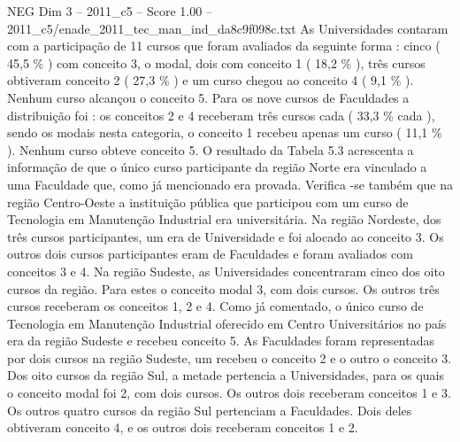 \begin{textsample}{NEG Dim 3 – 2011\_c5 – Score 1.00 – 2011\_c5/enade\_2011\_tec\_man\_ind\_da8c9f098c.txt}
As Universidades contaram com a participação de 11 cursos que foram avaliados da seguinte forma : cinco ( 45,5 \% ) com conceito 3, o modal, dois com conceito 1 ( 18,2 \% ), três cursos obtiveram conceito 2 ( 27,3 \% ) e um curso chegou ao conceito 4 ( 9,1 \% ).
Nenhum curso alcançou o conceito 5.
Para os nove cursos de Faculdades a distribuição foi : os conceitos 2 e 4 receberam três cursos cada ( 33,3 \% cada ), sendo os modais nesta categoria, o conceito 1 recebeu apenas um curso ( 11,1 \% ).
Nenhum curso obteve conceito 5.
O resultado da Tabela 5.3 acrescenta a informação de que o único curso participante da região Norte era vinculado a uma Faculdade que, como já mencionado era provada.
Verifica -se também que na região Centro-Oeste a instituição pública que participou com um curso de Tecnologia em Manutenção Industrial era universitária.
Na região Nordeste, dos três cursos participantes, um era de Universidade e foi alocado ao conceito 3.
Os outros dois cursos participantes eram de Faculdades e foram avaliados com conceitos 3 e 4.
Na região Sudeste, as Universidades concentraram cinco dos oito cursos da região.
Para estes o conceito modal 3, com dois cursos.
Os outros três cursos receberam os conceitos 1, 2 e 4.
Como já comentado, o único curso de Tecnologia em Manutenção Industrial oferecido em Centro Universitários no país era da região Sudeste e recebeu conceito 5.
As Faculdades foram representadas por dois cursos na região Sudeste, um recebeu o conceito 2 e o outro o conceito 3.
Dos oito cursos da região Sul, a metade pertencia a Universidades, para os quais o conceito modal foi 2, com dois cursos.
Os outros dois receberam conceitos 1 e 3.
Os outros quatro cursos da região Sul pertenciam a Faculdades.
Dois deles obtiveram conceito 4, e os outros dois receberam conceitos 1 e 2.

\end{textsample}
